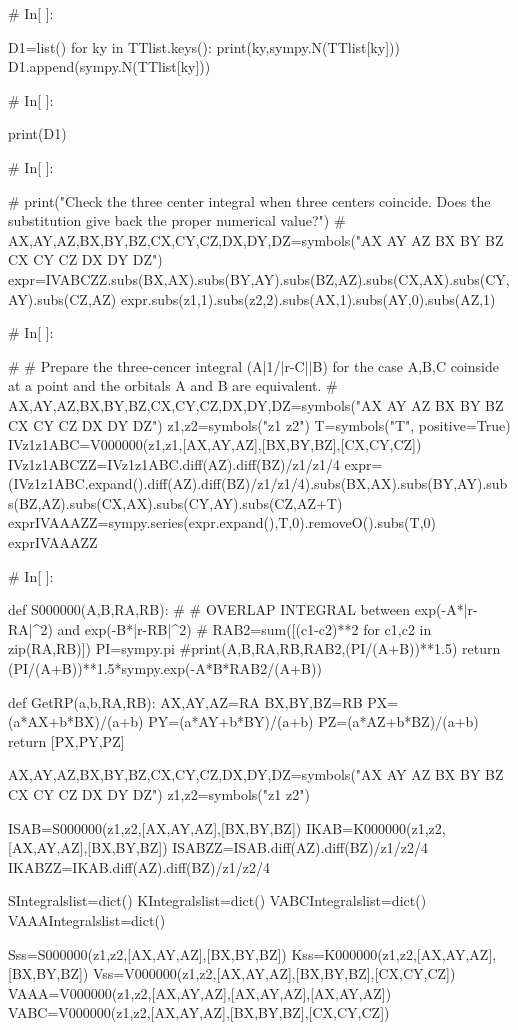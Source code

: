 # In[ ]:


D1=list()
for ky in TTlist.keys():
    print(ky,sympy.N(TTlist[ky]))
    D1.append(sympy.N(TTlist[ky]))


# In[ ]:


print(D1)


# In[ ]:


#
print("Check the three center integral when three centers coincide. Does the substitution give back the proper numerical value?")
#
AX,AY,AZ,BX,BY,BZ,CX,CY,CZ,DX,DY,DZ=symbols("AX AY AZ BX BY BZ CX CY CZ DX DY DZ") 
expr=IVABCZZ.subs(BX,AX).subs(BY,AY).subs(BZ,AZ).subs(CX,AX).subs(CY,AY).subs(CZ,AZ)
expr.subs(z1,1).subs(z2,2).subs(AX,1).subs(AY,0).subs(AZ,1)


# In[ ]:


#
# Prepare the three-cencer integral (A|1/|r-C||B) for the case A,B,C coinside at a point and the orbitals A and B are equivalent. 
#
AX,AY,AZ,BX,BY,BZ,CX,CY,CZ,DX,DY,DZ=symbols("AX AY AZ BX BY BZ CX CY CZ DX DY DZ") 
z1,z2=symbols("z1 z2")
T=symbols("T", positive=True)
IVz1z1ABC=V000000(z1,z1,[AX,AY,AZ],[BX,BY,BZ],[CX,CY,CZ])
IVz1z1ABCZZ=IVz1z1ABC.diff(AZ).diff(BZ)/z1/z1/4
expr=(IVz1z1ABC.expand().diff(AZ).diff(BZ)/z1/z1/4).subs(BX,AX).subs(BY,AY).subs(BZ,AZ).subs(CX,AX).subs(CY,AY).subs(CZ,AZ+T)
exprIVAAAZZ=sympy.series(expr.expand(),T,0).removeO().subs(T,0)
exprIVAAAZZ


# In[ ]:


def S000000(A,B,RA,RB):
#
#   OVERLAP INTEGRAL between exp(-A*|r-RA|^2) and exp(-B*|r-RB|^2)
#
    RAB2=sum([(c1-c2)**2 for c1,c2 in zip(RA,RB)])
    PI=sympy.pi
    #print(A,B,RA,RB,RAB2,(PI/(A+B))**1.5)
    return (PI/(A+B))**1.5*sympy.exp(-A*B*RAB2/(A+B))

def GetRP(a,b,RA,RB):
    AX,AY,AZ=RA
    BX,BY,BZ=RB
    PX=(a*AX+b*BX)/(a+b)
    PY=(a*AY+b*BY)/(a+b)
    PZ=(a*AZ+b*BZ)/(a+b)
    return [PX,PY,PZ]

AX,AY,AZ,BX,BY,BZ,CX,CY,CZ,DX,DY,DZ=symbols("AX AY AZ BX BY BZ CX CY CZ DX DY DZ") 
z1,z2=symbols("z1 z2")

ISAB=S000000(z1,z2,[AX,AY,AZ],[BX,BY,BZ])
IKAB=K000000(z1,z2,[AX,AY,AZ],[BX,BY,BZ])
ISABZZ=ISAB.diff(AZ).diff(BZ)/z1/z2/4
IKABZZ=IKAB.diff(AZ).diff(BZ)/z1/z2/4



SIntegralslist=dict()
KIntegralslist=dict()
VABCIntegralslist=dict()
VAAAIntegralslist=dict()

Sss=S000000(z1,z2,[AX,AY,AZ],[BX,BY,BZ])
Kss=K000000(z1,z2,[AX,AY,AZ],[BX,BY,BZ])
Vss=V000000(z1,z2,[AX,AY,AZ],[BX,BY,BZ],[CX,CY,CZ])
VAAA=V000000(z1,z2,[AX,AY,AZ],[AX,AY,AZ],[AX,AY,AZ])
VABC=V000000(z1,z2,[AX,AY,AZ],[BX,BY,BZ],[CX,CY,CZ])


